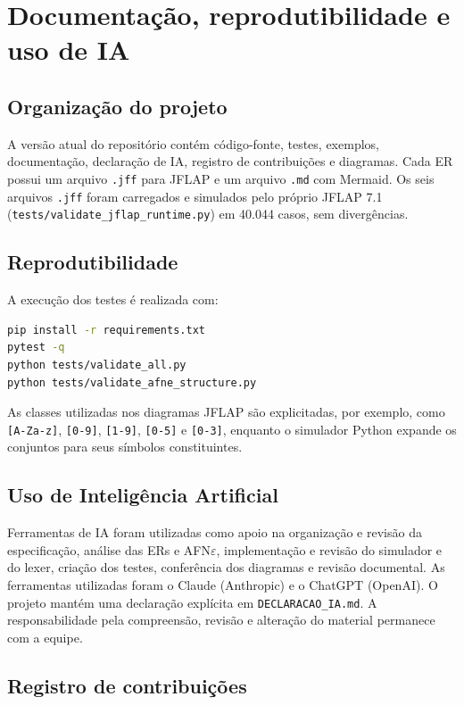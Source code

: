 \chapter{Documentação, reprodutibilidade e uso de IA}

\section{Organização do projeto}

A versão atual do repositório contém código-fonte, testes, exemplos, documentação, declaração de IA, registro de contribuições e diagramas. Cada ER possui um arquivo \texttt{.jff} para JFLAP e um arquivo \texttt{.md} com Mermaid. Os seis arquivos \texttt{.jff} foram carregados e simulados pelo próprio JFLAP 7.1 (\texttt{tests/validate\_jflap\_runtime.py}) em 40.044 casos, sem divergências.

\section{Reprodutibilidade}

A execução dos testes é realizada com:

\begin{lstlisting}[language=bash]
pip install -r requirements.txt
pytest -q
python tests/validate_all.py
python tests/validate_afne_structure.py
\end{lstlisting}

As classes utilizadas nos diagramas JFLAP são explicitadas, por exemplo, como \texttt{[A-Za-z]}, \texttt{[0-9]}, \texttt{[1-9]}, \texttt{[0-5]} e \texttt{[0-3]}, enquanto o simulador Python expande os conjuntos para seus símbolos constituintes.

\section{Uso de Inteligência Artificial}

Ferramentas de IA foram utilizadas como apoio na organização e revisão da especificação, análise das ERs e AFN$\varepsilon$, implementação e revisão do simulador e do lexer, criação dos testes, conferência dos diagramas e revisão documental. As ferramentas utilizadas foram o Claude (Anthropic) e o ChatGPT (OpenAI). O projeto mantém uma declaração explícita em \texttt{DECLARACAO\_IA.md}. A responsabilidade pela compreensão, revisão e alteração do material permanece com a equipe.

\section{Registro de contribuições}

